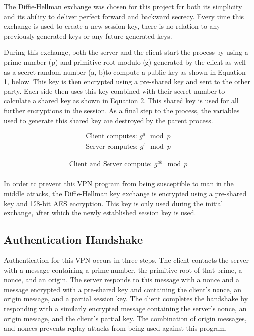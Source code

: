 \documentclass[journal]{IEEEtran}
\begin{document}
The Diffie-Hellman exchange was chosen for this project for both its simplicity and its ability to deliver perfect forward and backward secrecy. Every time this exchange is used to create a new session key, there is no relation to any previously generated keys or any future generated keys.

During this exchange, both the server and the client start the process by using a prime number (p) and primitive root modulo (g) generated by the client as well as a secret random number (a, b)to compute a public key as shown in Equation 1, below. This key is then encrypted using a pre-shared key and sent to the other party. Each side then uses this key combined with their secret number to calculate a shared key as shown in Equation 2. This shared key is used for all further encryptions in the session. As a final step to the process, the variables used to generate this shared key are destroyed by the parent process.

\begin{gather}
\mbox{Client computes: }g^{a}\mod{p} \nonumber \\ 
\mbox{Server computes: }g^{b}\mod{p}
\end{gather}

\begin{gather}
\mbox{Client and Server compute: }g^{ab}\mod{p}\\
\nonumber
\end{gather}

In order to prevent this VPN program from being susceptible to man in the middle attacks, the Diffie-Hellman key exchange is encrypted using a pre-shared key and 128-bit AES encryption. This key is only used during the initial exchange, after which the newly established session key is used.

\subsection*{Authentication Handshake}
Authentication for this VPN occurs in three steps. The client contacts the server with a message containing a prime number, the primitive root of that prime, a nonce, and an origin. The server responds to this message with a nonce and a message encrypted with a pre-shared key and containing the client's nonce, an origin message, and a partial session key. The client completes the handshake by responding with a similarly encrypted message containing the server's nonce, an origin message, and the client's partial key. The combination of origin messages, and nonces prevents replay attacks from being used against this program. 
\end{document}
